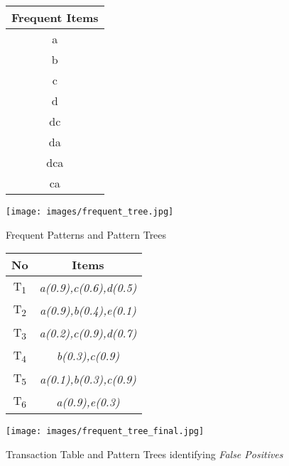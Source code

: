 \begin{figure}
\begin{minipage}{0.40\textwidth}
  \centering
  
	\begin{center}
	\begin{tabular}{ |c| } 
 	\hline
 		Frequent Items\\ \hline\hline
 		a \\ \hline
 		b \\ \hline
 		c \\ \hline
 		d \\ \hline
 		dc \\ \hline
 		da \\ \hline
 		dca \\ \hline
 		ca \\ \hline
\end{tabular}
\end{center}  


\end{minipage}
\hfill
\begin{minipage}{0.40\textwidth}
  \centering
  \texttt{[image: images/frequent\_tree.jpg]}
\end{minipage}
\caption{Frequent Patterns and Pattern Trees}
\label{figure:frequent_patterns}
\end{figure}

\begin{figure}
\begin{minipage}{.4\textwidth}
  \centering
  
	\begin{center}
	\begin{tabular}{ |c|c| } 
 	\hline
 		No & Items \\ \hline\hline
 		T\textsubscript{1} & \emph{a(0.9),c(0.6),d(0.5)}\\ \hline
 		T\textsubscript{2}& \emph{a(0.9),b(0.4),e(0.1)}\\ \hline
 		T\textsubscript{3}& \emph{a(0.2),c(0.9),d(0.7)}\\ \hline
 		T\textsubscript{4}& \emph{b(0.3),c(0.9)}\\ \hline
 		T\textsubscript{5}& \emph{a(0.1),b(0.3),c(0.9)} \\ \hline
 		T\textsubscript{6} & \emph{a(0.9),e(0.3)
}\\ \hline
\end{tabular}
\end{center}  
\end{minipage}
\hfill
\begin{minipage}{0.50\textwidth}
  \centering
  \texttt{[image: images/frequent\_tree\_final.jpg]}
\end{minipage}
\caption{Transaction Table and Pattern Trees identifying \emph{False Positives}}
\label{figure:frequent_patterns_final}
\end{figure}